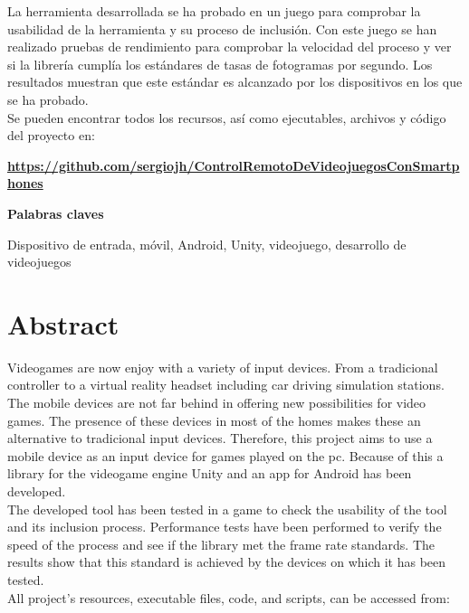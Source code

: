 La herramienta desarrollada se ha probado en un juego para comprobar la usabilidad de la herramienta y su proceso de inclusi\'on. Con este juego se han realizado pruebas de rendimiento para comprobar la velocidad del proceso y ver si la librer\'ia cumpl\'ia los est\'andares de tasas de fotogramas por segundo. Los resultados muestran que este est\'andar es alcanzado por los dispositivos en los que se ha probado.\\

Se pueden encontrar todos los recursos, as\'i como ejecutables, archivos y c\'odigo del proyecto en:\\
\scriptsize

\textbf{\url{https://github.com/sergiojh/ControlRemotoDeVideojuegosConSmartphones}}

\normalsize

\addvspace{1cm}


\Large{\textbf{Palabras claves}}
\normalsize

\addvspace{1cm}

Dispositivo de entrada, m\'ovil, Android, Unity, videojuego, desarrollo de videojuegos


\chapter{Abstract}

Videogames are now enjoy with a variety of input devices. From a tradicional controller to a virtual reality headset including car driving simulation stations. The mobile devices are not far behind in offering new possibilities for video games. The presence of these devices in most of the homes makes these an alternative to tradicional input devices. Therefore, this project aims to use a mobile device as an input device for games played on the pc. Because of this a library for the videogame engine Unity and an app for Android has been developed.\\

The developed tool has been tested in a game to check the usability of the tool and its inclusion process. Performance tests have been performed to verify the speed of the process and see if the library met the frame rate standards. The results show that this standard is achieved by the devices on which it has been tested.\\

All project's resources, executable files, code, and scripts, can be accessed from:\\


